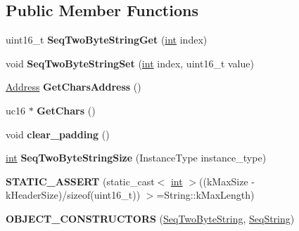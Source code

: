 \subsection*{Public Member Functions}
\begin{DoxyCompactItemize}
\item 
\mbox{\label{classv8_1_1internal_1_1SeqTwoByteString_ac94caf8a368f8726b88a3a562e7956a6}} 
uint16\+\_\+t {\bfseries Seq\+Two\+Byte\+String\+Get} (\mbox{\hyperlink{classint}{int}} index)
\item 
\mbox{\label{classv8_1_1internal_1_1SeqTwoByteString_a2ac7928dd1839d6b8a5fb4a5c2d14d5f}} 
void {\bfseries Seq\+Two\+Byte\+String\+Set} (\mbox{\hyperlink{classint}{int}} index, uint16\+\_\+t value)
\item 
\mbox{\label{classv8_1_1internal_1_1SeqTwoByteString_a748c0415d4f6a7b880d1b9c94d058090}} 
\mbox{\hyperlink{classuintptr__t}{Address}} {\bfseries Get\+Chars\+Address} ()
\item 
\mbox{\label{classv8_1_1internal_1_1SeqTwoByteString_afa5cf73f5a9c7bbe9a45a07a35c22dff}} 
uc16 $\ast$ {\bfseries Get\+Chars} ()
\item 
\mbox{\label{classv8_1_1internal_1_1SeqTwoByteString_ac526b0b4069ffb84b3b646562adddc21}} 
void {\bfseries clear\+\_\+padding} ()
\item 
\mbox{\label{classv8_1_1internal_1_1SeqTwoByteString_ae3726273ad079d4bb0ec9d4d56fa9358}} 
\mbox{\hyperlink{classint}{int}} {\bfseries Seq\+Two\+Byte\+String\+Size} (Instance\+Type instance\+\_\+type)
\item 
\mbox{\label{classv8_1_1internal_1_1SeqTwoByteString_aa3fea01681fb610275e89512ee6e110e}} 
{\bfseries S\+T\+A\+T\+I\+C\+\_\+\+A\+S\+S\+E\+RT} (static\+\_\+cast$<$ \mbox{\hyperlink{classint}{int}} $>$((k\+Max\+Size -\/ k\+Header\+Size)/sizeof(uint16\+\_\+t)) $>$=String\+::k\+Max\+Length)
\item 
\mbox{\label{classv8_1_1internal_1_1SeqTwoByteString_af7281824dbcc19dee37b7d0edef7c284}} 
{\bfseries O\+B\+J\+E\+C\+T\+\_\+\+C\+O\+N\+S\+T\+R\+U\+C\+T\+O\+RS} (\mbox{\hyperlink{classv8_1_1internal_1_1SeqTwoByteString}{Seq\+Two\+Byte\+String}}, \mbox{\hyperlink{classv8_1_1internal_1_1SeqString}{Seq\+String}})
\end{DoxyCompactItemize}
